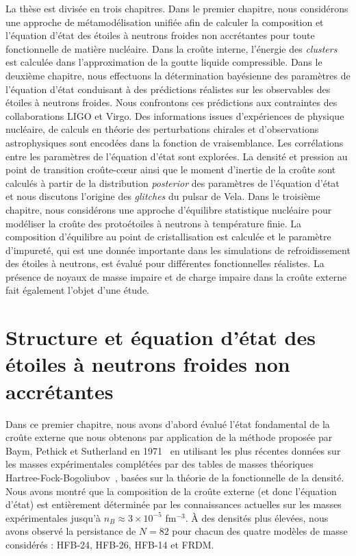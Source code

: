 La thèse est divisée en trois chapitres. 
%
Dans le premier chapitre, nous considérons une approche de métamodélisation
unifiée afin de calculer la composition et l'équation d'état des étoiles à
neutrons froides non accrétantes pour toute fonctionnelle de matière nucléaire. 
Dans la croûte interne, l'énergie des \textit{clusters} est calculée dans 
l'approximation de la goutte liquide compressible. 
%
Dans le deuxième chapitre, nous effectuons la détermination bayésienne des
paramètres de l'équation d'état conduisant à des prédictions réalistes sur 
les observables des étoiles à neutrons froides. Nous confrontons ces 
prédictions aux contraintes des collaborations LIGO et Virgo. 
Des informations issues d'expériences de physique nucléaire, de calculs en 
théorie des perturbations chirales et d'observations astrophysiques sont 
encodées dans la fonction de vraisemblance. Les corrélations entre les 
paramètres de l'équation d'état sont explorées. La densité et pression au point 
de transition croûte-c\oe ur ainsi que le moment d'inertie de la croûte sont 
calculés à partir de la distribution \textit{posterior} des paramètres de
l'équation d'état et nous discutons l'origine des \textit{glitches} du pulsar 
de Vela. 
%
Dans le troisième chapitre, nous considérons une approche d'équilibre 
statistique nucléaire pour modéliser la croûte des protoétoiles à neutrons à 
température finie. La composition d'équilibre au point de cristallisation 
est calculée et le paramètre d'impureté, qui est une donnée importante dans 
les simulations de refroidissement des étoiles à neutrons, est évalué pour 
différentes fonctionnelles réalistes. La présence de noyaux de masse impaire et 
de charge impaire dans la croûte externe fait également l'objet d'une étude. 

\section{Structure et équation d'état des étoiles à neutrons froides non
accrétantes}

Dans ce premier chapitre, nous avons d'abord évalué l'état fondamental de la 
croûte externe que nous obtenons par application de la méthode proposée par 
Baym, Pethick et Sutherland en 1971~\cite{BPS} en utilisant les plus récentes
données sur les masses expérimentales\cite{Huang2017,Welker2017} complétées par 
des tables de masses théoriques Hartree-Fock-Bogoliubov~\cite{Samyn2002}, 
basées sur la théorie de la fonctionnelle de la densité. 
Nous avons montré que la composition de la croûte externe (et donc l'équation 
d'état) est entièrement déterminée par les connaissances actuelles sur les 
masses expérimentales jusqu'à $n_B \approx 3\times 10^{-5}$ fm$^{-3}$.
À des densités plus élevées, nous avons observé la persistance de $N=82$ pour 
chacun des quatre modèles de masse considérés : HFB-24, HFB-26, HFB-14 et FRDM. 

